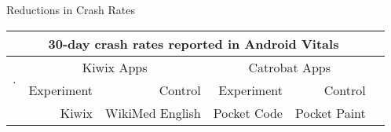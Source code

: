 \begin{adjustwidth}{-2.5 cm}{-2.5 cm}\centering\begin{threeparttable}[!htp]\centering
\caption{Reductions in Crash Rates}\label{tab:evaluation-reductions-in-crash-rates}
\scriptsize
\begin{tabular}{lrrrrr}\toprule
&\multicolumn{4}{c}{30-day crash rates reported in Android Vitals~\tnote{0}} \\\midrule
\multirow{2}{*}{.} &\multicolumn{2}{c}{Kiwix Apps}| &\multicolumn{2}{c}{Catrobat Apps} \\
\cellcolor[HTML]{efefef}Release&\cellcolor[HTML]{efefef}Experiment &Control  &\cellcolor[HTML]{efefef}Experiment &Control \\

\cellcolor[HTML]{efefef}&\cellcolor[HTML]{efefef}Kiwix & WikiMed English &\cellcolor[HTML]{efefef}Pocket Code &Pocket Paint \\


\end{tabular}
\end{threeparttable}
\end{adjustwidth}
